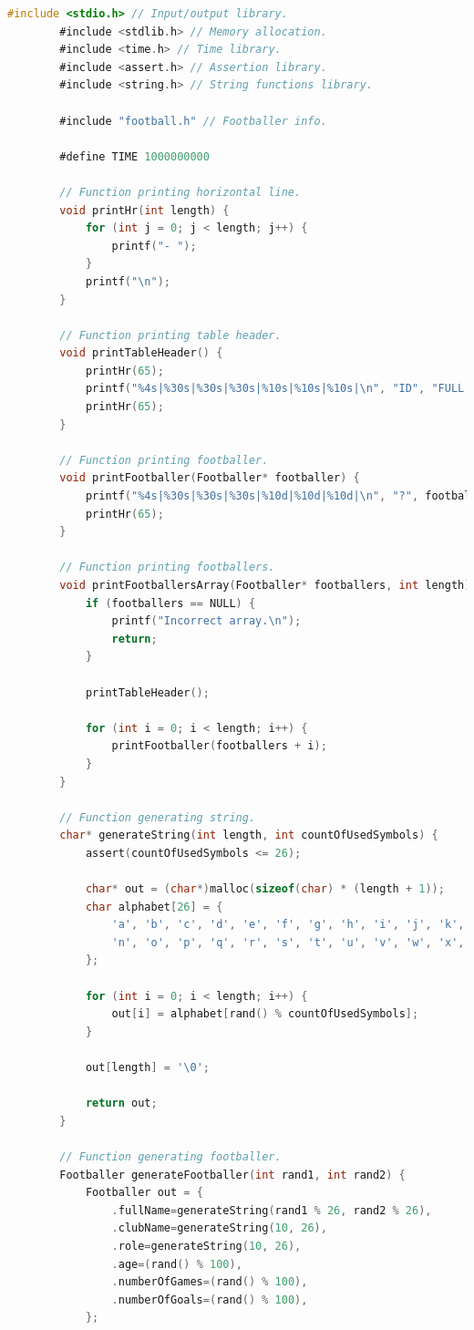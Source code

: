 \documentclass[12pt]{article}
\begin{document}
	\begin{lstlisting}[language=C]
		#include <stdio.h> // Input/output library.
		#include <stdlib.h> // Memory allocation.
		#include <time.h> // Time library.
		#include <assert.h> // Assertion library.
		#include <string.h> // String functions library.
		
		#include "football.h" // Footballer info.
		
		#define TIME 1000000000
		
		// Function printing horizontal line.
		void printHr(int length) {
			for (int j = 0; j < length; j++) {
				printf("- ");
			}
			printf("\n");
		}
		
		// Function printing table header.
		void printTableHeader() {
			printHr(65);
			printf("%4s|%30s|%30s|%30s|%10s|%10s|%10s|\n", "ID", "FULL NAME", "CLUB NAME", "ROLE", "AGE", "GAMES", "GOALS");
			printHr(65);
		}
		
		// Function printing footballer.
		void printFootballer(Footballer* footballer) {
			printf("%4s|%30s|%30s|%30s|%10d|%10d|%10d|\n", "?", footballer->fullName, footballer->clubName, footballer->role, footballer->age, footballer->numberOfGames, footballer->numberOfGoals);
			printHr(65);
		}
		
		// Function printing footballers.
		void printFootballersArray(Footballer* footballers, int length) {
			if (footballers == NULL) {
				printf("Incorrect array.\n");
				return;
			}
			
			printTableHeader();
			
			for (int i = 0; i < length; i++) {
				printFootballer(footballers + i);
			}
		}
		
		// Function generating string.
		char* generateString(int length, int countOfUsedSymbols) {
			assert(countOfUsedSymbols <= 26);
			
			char* out = (char*)malloc(sizeof(char) * (length + 1));
			char alphabet[26] = {
				'a', 'b', 'c', 'd', 'e', 'f', 'g', 'h', 'i', 'j', 'k', 'l', 'm',
				'n', 'o', 'p', 'q', 'r', 's', 't', 'u', 'v', 'w', 'x', 'y', 'z'
			};
			
			for (int i = 0; i < length; i++) {
				out[i] = alphabet[rand() % countOfUsedSymbols];
			}
			
			out[length] = '\0';
			
			return out;
		}
		
		// Function generating footballer.
		Footballer generateFootballer(int rand1, int rand2) {
			Footballer out = {
				.fullName=generateString(rand1 % 26, rand2 % 26),
				.clubName=generateString(10, 26),
				.role=generateString(10, 26),
				.age=(rand() % 100),
				.numberOfGames=(rand() % 100),
				.numberOfGoals=(rand() % 100),
			};
			

\end{lstlisting}
\end{document}
